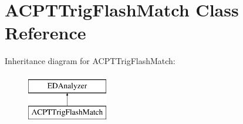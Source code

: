 \hypertarget{classACPTTrigFlashMatch}{}\section{A\+C\+P\+T\+Trig\+Flash\+Match Class Reference}
\label{classACPTTrigFlashMatch}
Inheritance diagram for A\+C\+P\+T\+Trig\+Flash\+Match\+:\begin{figure}[H]
\begin{center}
\leavevmode
\includegraphics[height=2.000000cm]{classACPTTrigFlashMatch}
\end{center}
\end{figure}
